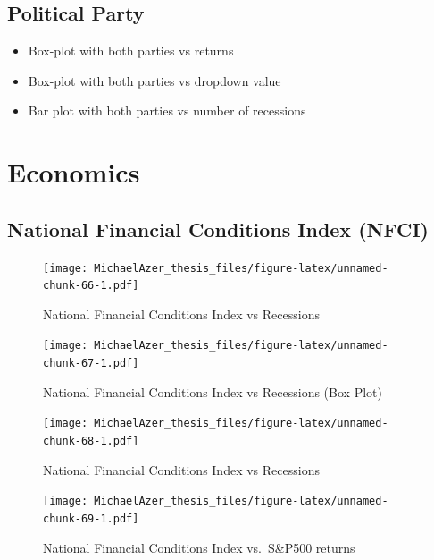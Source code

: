\documentclass[]{book}
\providecommand{\tightlist}{%
  \setlength{\itemsep}{0pt}\setlength{\parskip}{0pt}}
\begin{document}
\hypertarget{political-party}{%
\subsection{Political Party}\label{political-party}}

\begin{itemize}
\tightlist
\item
  Box-plot with both parties vs returns
\item
  Box-plot with both parties vs dropdown value
\item
  Bar plot with both parties vs number of recessions
\end{itemize}

\hypertarget{economics}{%
\section{Economics}\label{economics}}

\hypertarget{national-financial-conditions-index-nfci}{%
\subsection{National Financial Conditions Index (NFCI)}\label{national-financial-conditions-index-nfci}}

\begin{figure}
\centering
\texttt{[image: MichaelAzer\_thesis\_files/figure-latex/unnamed-chunk-66-1.pdf]}
\caption{\label{fig:unnamed-chunk-66}\label{fig:figs}National Financial Conditions Index vs Recessions}
\end{figure}

\begin{figure}
\centering
\texttt{[image: MichaelAzer\_thesis\_files/figure-latex/unnamed-chunk-67-1.pdf]}
\caption{\label{fig:unnamed-chunk-67}\label{fig:figs}National Financial Conditions Index vs Recessions (Box Plot)}
\end{figure}

\begin{figure}
\centering
\texttt{[image: MichaelAzer\_thesis\_files/figure-latex/unnamed-chunk-68-1.pdf]}
\caption{\label{fig:unnamed-chunk-68}\label{fig:figs}National Financial Conditions Index vs Recessions}
\end{figure}

\begin{figure}
\centering
\texttt{[image: MichaelAzer\_thesis\_files/figure-latex/unnamed-chunk-69-1.pdf]}
\caption{\label{fig:unnamed-chunk-69-1}\label{fig:figs}National Financial Conditions Index vs.~S\&P500 returns}
\end{figure}
\end{document}
